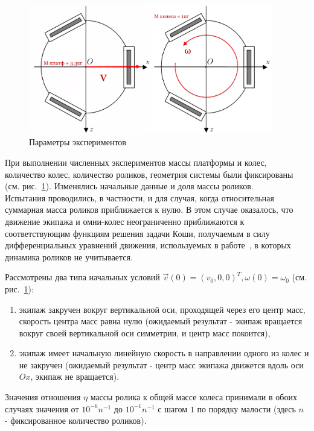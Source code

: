 \begin{figure}[!ht]
    \centering
    \includegraphics[width=0.95\textwidth]{content/parts/3_friction/diploma/img/art/my_exp_setup.png}
    \caption{Параметры экспериментов}
    \label{fig:my_exp_setup}
\end{figure}

При выполнении численных экспериментов массы платформы и колес, количество колес, количество роликов, геометрия системы были фиксированы (см. рис.~\ref{fig:my_exp_setup}). Изменялись начальные данные и доля массы роликов.\\

Испытания проводились, в частности, и для случая, когда относительная суммарная масса роликов приближается к нулю. В этом случае оказалось, что движение экипажа и омни-колес неограниченно приближаются к соответствующим функциям решения задачи Коши, получаемым в силу дифференциальных уравнений движения, используемых в работе~\cite{Borisov2011}, в которых динамика роликов не учитывается.

Рассмотрены два типа начальных условий $\vec{v}(0) = (v_0, 0, 0)^T, \omega(0) = \omega_0$ (см. рис.~\ref{fig:my_exp_setup}):
\begin{enumerate}
\item экипаж закручен вокруг вертикальной оси, проходящей через его центр масс, скорость центра масс равна нулю (ожидаемый результат - экипаж вращается вокруг своей вертикальной оси симметрии, и центр масс покоится),
\item экипаж имеет начальную линейную скорость в направлении одного из колес и не закручен (ожидаемый результат - центр масс экипажа движется вдоль оси $Ox$, экипаж не вращается).
\end{enumerate}

Значения отношения $\eta$ массы ролика к общей массе колеса принимали в обоих случаях значения от $10^{-6}n^{-1}$ до $10^{-1}n^{-1}$ с шагом $1$ по порядку малости (здесь $n$ - фиксированное количество роликов).

